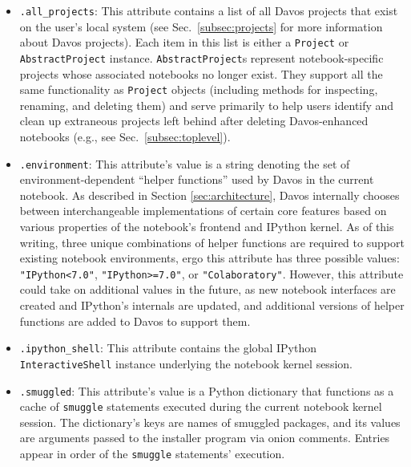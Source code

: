 \documentclass[preprint,12pt,a4paper]{elsarticle}
\begin{document}
\begin{itemize}

\item \texttt{.all\_projects}: This attribute contains a list of all Davos projects that exist on the user's local system (see Sec.~\ref{subsec:projects} for more information about Davos projects).
  Each item in this list is either a \texttt{Project} or \texttt{AbstractProject} instance.
  \texttt{AbstractProject}s represent notebook-specific projects whose associated notebooks no longer exist.
  They support all the same functionality as \texttt{Project} objects (including methods for inspecting, renaming, and deleting them) and serve primarily to help users identify and clean up extraneous projects left behind after deleting Davos-enhanced notebooks (e.g., see Sec.~\ref{subsec:toplevel}).

\item \texttt{.environment}: This attribute's value is a string denoting the set of environment-dependent ``helper functions'' used by Davos in the current notebook.
  As described in Section \ref{sec:architecture}, Davos internally chooses between interchangeable implementations of certain core features based on various properties of the notebook's frontend and IPython kernel.
  As of this writing, three unique combinations of helper functions are required to support existing notebook environments, ergo this attribute has three possible values: \texttt{"IPython<7.0"}, \texttt{"IPython>=7.0"}, or \texttt{"Colaboratory"}.
  However, this attribute could take on additional values in the future, as new notebook interfaces are created and IPython's internals are updated, and additional versions of helper functions are added to Davos to support them.

\item \texttt{.ipython\_shell}: This attribute contains the global IPython \texttt{InteractiveShell} instance underlying the notebook kernel session.

\item \texttt{.smuggled}: This attribute's value is a Python dictionary that functions as a cache of \texttt{smuggle} statements executed during the current notebook kernel session.
  The dictionary's keys are names of smuggled packages, and its values are arguments passed to the installer program via onion comments.
  Entries appear in order of the \texttt{smuggle} statements' execution.

\end{itemize}
\end{document}
